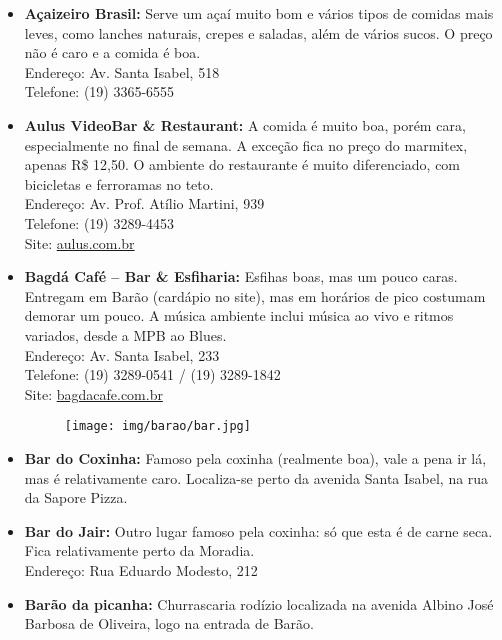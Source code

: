\begin{itemize}
    \item   \textbf{Açaizeiro Brasil:} Serve um açaí muito bom e vários tipos de
        comidas mais leves, como lanches naturais, crepes e saladas, além de
        vários sucos. O preço não é caro e a comida é boa.
        \\Endereço: Av. Santa Isabel, 518
        \\Telefone: (19) 3365-6555 %

    \item   \textbf{Aulus VideoBar \& Restaurant:} A comida é muito boa, porém
        cara, especialmente no final de semana. A exceção fica no preço do
        marmitex, apenas R\$ 12,50. O ambiente do restaurante é muito diferenciado,
        com bicicletas e ferroramas no teto.
        \\Endereço: Av. Prof. Atílio Martini, 939
        \\Telefone: (19) 3289-4453
        \\Site: \url{aulus.com.br}

    \item   \textbf{Bagdá Café -- Bar \& Esfiharia:} Esfihas boas, mas um pouco
        caras. Entregam em Barão (cardápio no site), mas em horários de pico
        costumam demorar um pouco. A música ambiente inclui música ao vivo e
        ritmos variados, desde a MPB ao Blues.
        \\Endereço: Av. Santa Isabel, 233
        \\Telefone: (19) 3289-0541 / (19) 3289-1842
        \\Site: \url{bagdacafe.com.br}

\begin{figure}[h!]
    \centering
    \texttt{[image: img/barao/bar.jpg]}
\end{figure}

    \item   \textbf{Bar do Coxinha:} Famoso pela coxinha (realmente boa), vale a
        pena ir lá, mas é relativamente caro. Localiza-se perto da avenida Santa
        Isabel, na rua da Sapore Pizza.

    \item   \textbf{Bar do Jair:} Outro lugar famoso pela coxinha: só que esta é
        de carne seca. Fica relativamente perto da Moradia.
        \\Endereço: Rua Eduardo Modesto, 212

    \item   \textbf{Barão da picanha:} Churrascaria rodízio localizada na
        avenida Albino José Barbosa de Oliveira, logo na entrada de Barão.


\end{itemize}
